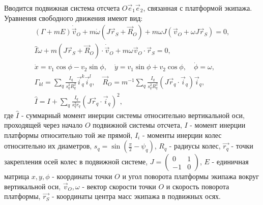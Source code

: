 Вводится подвижная система отсчета $O\vec{e}_1\vec{e}_2$, связанная с платформой экипажа. Уравнения свободного движения имеют вид:
\begin{eqnarray*}
    (\Gamma+mE)\dot{\vec{v}}_O + m\dot{\omega}(J\vec{r}_S+\vec{R}_O)+m\omega J(\vec{v}_O + \omega J\vec{r}_S) = 0,\\
    \hat{I}\dot{\omega} + m(J\vec{r}_S+\vec{R}_O)\cdot\dot{\vec{v}}_O+m\omega\vec{v}_O\cdot\vec{r}_S = 0,\\
    \dot{x} = v_1\cos\phi - v_2\sin\phi, \quad \dot{y} = v_1\sin\phi + v_2\cos\phi, \quad \dot{\phi} = \omega,\\
    \Gamma_{kl} = \sum_q \frac{I_q}{s_q^2 R_q^2}\vec{i}_q^k\vec{i}_q^l, \quad \vec{R}_O = m^{-1}\sum_q \frac{I_q}{s_q^2 R_q^2}(J\vec{r}_q\cdot \vec{i}_q) \vec{i}_q,\\
    \hat{I} = I + \sum_q \frac{I_q}{s_q^2 r_q}(J\vec{r}_q\cdot \vec{i}_q)^2,
\end{eqnarray*}
\newline
где $\hat{I}$ - суммарный момент инерции системы относительно вертикальной оси, проходящей через начало $O$ подвижной системы отсчета,\newline
$I$ - момент инерции платформы относительно той же прямой,\newline
$I_i$ - моменты инерции колес относительно их диаметров,\newline
$s_q = \sin(\frac{\pi}{2} - \psi_q)$, \quad $R_q$ - радиусы колес,\newline
$\vec{r_q}$ - точки закрепления осей колес в подвижной системе,\newline
$J = \left(\begin{array}{cc}0 & 1\\-1 & 0\end{array}\right)$,
\quad $E$ - единичная матрица\newline
$x,y,\phi$ - координаты точки $O$ и угол поворота платформы экипажа вокруг вертикальной оси,\newline
$\vec{v}_O, \omega$ - вектор скорости точки $O$ и скорость поворота платформы,\newline
$\vec{r_S}$ - координаты центра масс экипажа в подвижных осях.


